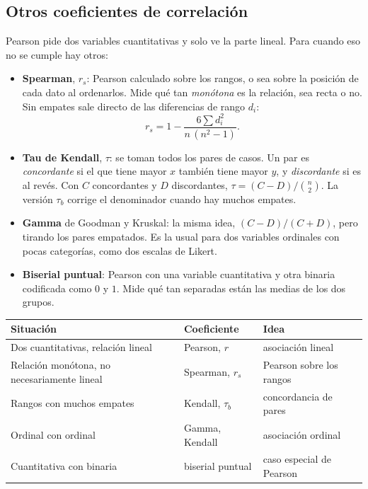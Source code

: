 \documentclass[11pt,letterpaper]{article}
\begin{document}
\subsection*{Otros coeficientes de correlación}

Pearson pide dos variables cuantitativas y solo ve la parte lineal.
Para cuando eso no se cumple hay otros:

\begin{itemize}[itemsep=0.3em]
    \item \textbf{Spearman}, $r_s$: Pearson calculado sobre los rangos,
          o sea sobre la posición de cada dato al ordenarlos. Mide qué
          tan \emph{monótona} es la relación, sea recta o no. Sin
          empates sale directo de las diferencias de rango $d_i$:
          \[
              r_s = 1 - \frac{6 \sum d_i^2}{n\,(n^2 - 1)} .
          \]
    \item \textbf{Tau de Kendall}, $\tau$: se toman todos los pares de
          casos. Un par es \emph{concordante} si el que tiene mayor $x$
          también tiene mayor $y$, y \emph{discordante} si es al revés.
          Con $C$ concordantes y $D$ discordantes,
          $\tau = (C - D) / \binom{n}{2}$. La versión $\tau_b$ corrige
          el denominador cuando hay muchos empates.
    \item \textbf{Gamma} de Goodman y Kruskal: la misma idea,
          $(C - D) / (C + D)$, pero tirando los pares empatados. Es la
          usual para dos variables ordinales con pocas categorías, como
          dos escalas de Likert.
    \item \textbf{Biserial puntual}: Pearson con una variable
          cuantitativa y otra binaria codificada como $0$ y $1$. Mide
          qué tan separadas están las medias de los dos grupos.
\end{itemize}

\begin{center}
\small
\begin{tabular}{>{\raggedright\arraybackslash}p{5.2cm}ll}
    \toprule
    \textbf{Situación} & \textbf{Coeficiente} & \textbf{Idea} \\
    \midrule
    Dos cuantitativas, relación lineal & Pearson, $r$
        & asociación lineal \\
    \addlinespace
    Relación monótona, no necesariamente lineal & Spearman, $r_s$
        & Pearson sobre los rangos \\
    \addlinespace
    Rangos con muchos empates & Kendall, $\tau_b$
        & concordancia de pares \\
    \addlinespace
    Ordinal con ordinal & Gamma, Kendall & asociación ordinal \\
    \addlinespace
    Cuantitativa con binaria & biserial puntual
        & caso especial de Pearson \\
    \bottomrule
\end{tabular}
\end{center}
\end{document}
